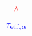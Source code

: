 \documentclass[12pt,letterpaper]{article}
\begin{document}
{\Large

$$
{\color{red} \delta
}
$$

$$
{\color{blue} \tau_{\rm eff, \alpha}
}
$$

}
\end{document}

